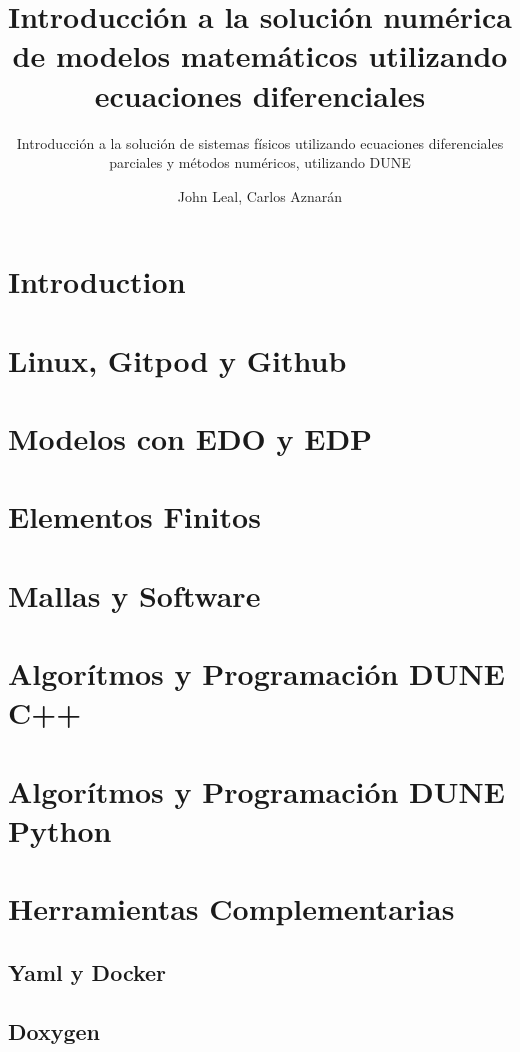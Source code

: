 \documentclass[10pt,
	a4paper,
	spanish,
	titlepage=firstiscover,
	titlepage=true,
	BCOR=2cm,
	DIV=12
]{scrbook}
\author{John Leal, Carlos Aznarán}
\title{Introducción a la solución numérica de modelos matemáticos utilizando ecuaciones 
diferenciales}
\subtitle{Introducción a la solución de sistemas físicos utilizando ecuaciones diferenciales 
parciales y métodos numéricos, utilizando DUNE}
\begin{document}
\maketitle

\begin{refsection}
	\chapter{Introduction}
	
	\chapter{Linux, Gitpod y Github}
	
	\chapter{Modelos con EDO y EDP}
	
	\chapter{Elementos Finitos}
	
	\chapter{Mallas y Software}
	
	\chapter{Algorítmos y Programación DUNE C++}
	
	\chapter{Algorítmos y Programación DUNE Python}
	
	\chapter{Herramientas Complementarias}
	\section{Yaml y Docker}
	
	\section{Doxygen}
	

\end{refsection}
\end{document}
